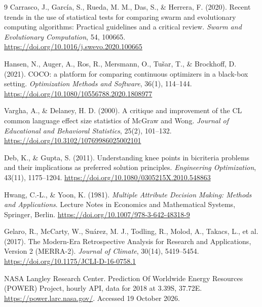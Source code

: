 \documentclass[final,3p,times]{elsarticle}
\begin{document}
\begin{thebibliography}{9}
Carrasco, J., Garc\'{i}a, S., Rueda, M. M., Das, S., \& Herrera, F. (2020). Recent trends in the use of statistical tests for comparing swarm and evolutionary computing algorithms: Practical guidelines and a critical review. \textit{Swarm and Evolutionary Computation}, 54, 100665. \url{https://doi.org/10.1016/j.swevo.2020.100665}

Hansen, N., Auger, A., Ros, R., Mersmann, O., Tu\v{s}ar, T., \& Brockhoff, D. (2021). COCO: a platform for comparing continuous optimizers in a black-box setting. \textit{Optimization Methods and Software}, 36(1), 114--144. \url{https://doi.org/10.1080/10556788.2020.1808977}

Vargha, A., \& Delaney, H. D. (2000). A critique and improvement of the CL common language effect size statistics of McGraw and Wong. \textit{Journal of Educational and Behavioral Statistics}, 25(2), 101--132. \url{https://doi.org/10.3102/10769986025002101}

Deb, K., \& Gupta, S. (2011). Understanding knee points in bicriteria problems and their implications as preferred solution principles. \textit{Engineering Optimization}, 43(11), 1175--1204. \url{https://doi.org/10.1080/0305215X.2010.548863}

Hwang, C.-L., \& Yoon, K. (1981). \textit{Multiple Attribute Decision Making: Methods and Applications}. Lecture Notes in Economics and Mathematical Systems, Springer, Berlin. \url{https://doi.org/10.1007/978-3-642-48318-9}

Gelaro, R., McCarty, W., Su\'{a}rez, M. J., Todling, R., Molod, A., Takacs, L., et al. (2017). The Modern-Era Retrospective Analysis for Research and Applications, Version 2 (MERRA-2). \textit{Journal of Climate}, 30(14), 5419--5454. \url{https://doi.org/10.1175/JCLI-D-16-0758.1}

NASA Langley Research Center. Prediction Of Worldwide Energy Resources (POWER) Project, hourly API, data for 2018 at 3.39\degree S, 37.72\degree E. \url{https://power.larc.nasa.gov/}. Accessed 19 October 2026.

\end{thebibliography}
\end{document}
